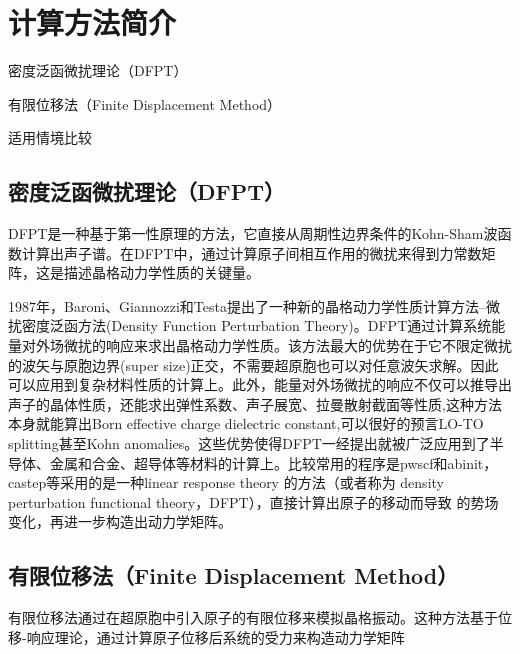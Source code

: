 \section{计算方法简介}\label{sec:计算方法简介}


\begin{Abstract}
    \item 密度泛函微扰理论（DFPT）
    \item 有限位移法（Finite Displacement Method）
    \item 适用情境比较
\end{Abstract}


\subsection{密度泛函微扰理论（DFPT）}\label{subsec:计算方法简介-密度泛函微扰理论（DFPT）}

DFPT是一种基于第一性原理的方法，它直接从周期性边界条件的Kohn-Sham波函数计算出声子谱。在DFPT中，通过计算原子间相互作用的微扰来得到力常数矩阵，这是描述晶格动力学性质的关键量。

\begin{extend}
    1987年，Baroni、Giannozzi和Testa提出了一种新的晶格动力学性质计算方法--微扰密度泛函方法(Density Function Perturbation Theory)。DFPT通过计算系统能量对外场微扰的响应来求出晶格动力学性质。该方法最大的优势在于它不限定微扰的波矢与原胞边界(super size)正交，不需要超原胞也可以对任意波矢求解。因此可以应用到复杂材料性质的计算上。此外，能量对外场微扰的响应不仅可以推导出声子的晶体性质，还能求出弹性系数、声子展宽、拉曼散射截面等性质,这种方法本身就能算出Born effective charge dielectric constant,可以很好的预言LO-TO splitting甚至Kohn anomalies。这些优势使得DFPT一经提出就被广泛应用到了半导体、金属和合金、超导体等材料的计算上。比较常用的程序是pwscf和abinit，castep等采用的是一种linear response theory 的方法（或者称为  density perturbation functional theory，DFPT），直接计算出原子的移动而导致  的势场变化，再进一步构造出动力学矩阵。
\end{extend}

\subsection{有限位移法（Finite Displacement Method）}\label{sec:计算方法简介-有限位移法（Finite Displacement Method）}

有限位移法通过在超原胞中引入原子的有限位移来模拟晶格振动。这种方法基于位移-响应理论，通过计算原子位移后系统的受力来构造动力学矩阵

